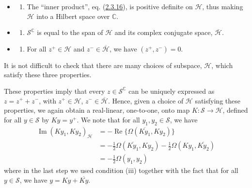 \documentclass[11pt,a4paper]{article}
\providecommand{\tightlist}{\setlength{\itemsep}{0pt}\setlength{\parskip}{0pt}}
\begin{document}
\begin{itemize}
\item
  \begin{enumerate}
  \def\labelenumi{(\roman{enumi})}
  \tightlist
  \item
    The ``inner product'', eq. (\hyperref[eq:2.3.16]{2.3.16}), is positive definite on \(\mathcal{H}\), thus making \(\mathcal{H}\) into a Hilbert space over \(\mathbb{C}\).
  \end{enumerate}
\item
  \begin{enumerate}
  \def\labelenumi{(\roman{enumi})}
  \setcounter{enumi}{1}
  \tightlist
  \item
    \(\mathcal{S}^{\mathbb{C}}\) is equal to the span of \(\mathcal{H}\) and its complex conjugate space, \(\overline{\mathcal{H}}\).
  \end{enumerate}
\item
  \begin{enumerate}
  \def\labelenumi{(\roman{enumi})}
  \setcounter{enumi}{2}
  \tightlist
  \item
    For all \(z^+ \in \mathcal{H}\) and \(z^- \in \overline{\mathcal{H}}\), we have \((z^+, z^-) = 0\).
  \end{enumerate}
\end{itemize}

\hypertarget{source-41}{}

It is not difficult to check that there are many choices of subspace, \(\mathcal{H}\), which satisfy these three properties.

These properties imply that every \(z \in \mathcal{S}^{\mathbb{C}}\) can be uniquely expressed as \(z = z^+ + z^-\), with \(z^+ \in \mathcal{H}\), \(z^- \in \overline{\mathcal{H}}\). Hence, given a choice of \(\mathcal{H}\) satisfying these properties, we again obtain a real-linear, one-to-one, onto map \(K: \mathcal{S} \to \mathcal{H}\), defined for all \(y \in \mathcal{S}\) by \(Ky = y^+\). We note that for all \(y_1, y_2 \in \mathcal{S}\), we have
\begin{equation*}
\begin{aligned} \operatorname{Im}(K y_1, K y_2)_{\mathcal{H}} &= - \operatorname{Re} \{ \Omega(\overline{K y_1}, K y_2) \} \\ &= - \frac{1}{2} \Omega(\overline{K y_1}, K y_2) - \frac{1}{2} \Omega(K y_1, \overline{K y_2}) \\ &= - \frac{1}{2} \Omega(y_1, y_2) \end{aligned} \tag{2.3.22}\label{eq:2.3.22}
\end{equation*}
where in the last step we used condition (iii) together with the fact that for all \(y \in \mathcal{S}\), we have \(y = Ky + \overline{Ky}\).
\end{document}
